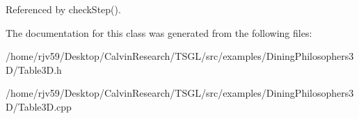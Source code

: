 Referenced by check\+Step().



The documentation for this class was generated from the following files\+:\begin{DoxyCompactItemize}
\item 
/home/rjv59/\+Desktop/\+Calvin\+Research/\+T\+S\+G\+L/src/examples/\+Dining\+Philosophers3\+D/Table3\+D.\+h\item 
/home/rjv59/\+Desktop/\+Calvin\+Research/\+T\+S\+G\+L/src/examples/\+Dining\+Philosophers3\+D/Table3\+D.\+cpp\end{DoxyCompactItemize}
